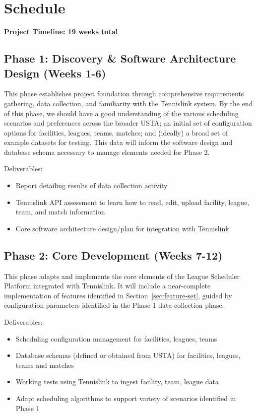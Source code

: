 \section{Schedule}
\label{sec:schedule}

\textbf{Project Timeline: 19 weeks total}

\subsection{Phase 1: Discovery \& Software Architecture Design (Weeks 1-6)}
This phase establishes project foundation through comprehensive requirements gathering, data collection, and familiarity with the Tennislink system. By the end of this phase, we should have a good understanding of the various scheduling scenarios and preferences across the broader USTA; an initial set of configuration options for facilities, leagues, teams, matches; and (ideally) a broad set of example datasets for testing. This data will inform the software design and database schema necessary to manage elements needed for Phase 2.

Deliverables:
\begin{itemize}
    \item Report detailing results of data collection activity
    \item Tennislink API assessment to learn how to read, edit, upload facility, league, team, and match information
    \item Core software architecture design/plan for integration with Tennislink
\end{itemize}

\subsection{Phase 2: Core Development (Weeks 7-12)}
This phase adapts and implements the core elements of the League Scheduler Platform integrated with Tennislink. It will include a near-complete implementation of features identified in Section~\ref{sec:feature-set}, guided by configuration parameters identified in the Phase 1 data-collection phase.

Deliverables:
\begin{itemize}
    \item Scheduling configuration management for facilities, leagues, teams
    \item Database schemas (defined or obtained from USTA) for facilities, leagues, teams and matches
    \item Working tests using Tennislink to ingest facility, team, league data
    \item Adapt scheduling algorithms to support variety of scenarios identified in Phase 1
\end{itemize}

